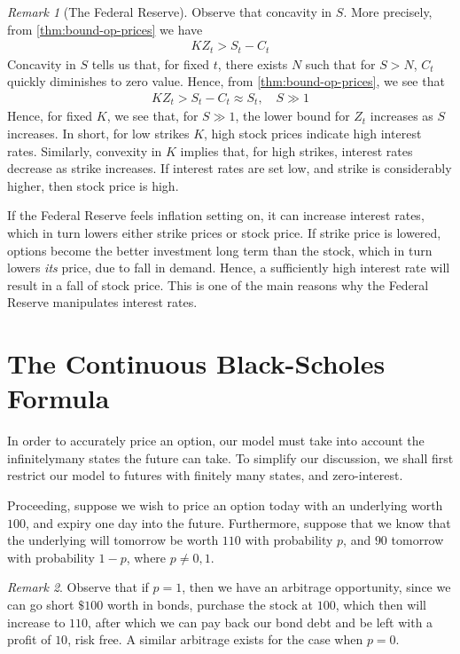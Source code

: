 \documentclass[12pt]{article}
\theoremstyle{plain}
\theoremstyle{definition}
\theoremstyle{remark}
\newtheorem*{remark}{Remark}
\numberwithin{equation}{section}  %
\begin{document}
\begin{remark}[The Federal Reserve]
	Observe that concavity in $S$. More precisely, from
	\cref{thm:bound-op-prices} we have
	\begin{equation*}
		\begin{split}
			KZ_{t} > S_{t} - C_{t}
		\end{split}
	\end{equation*}
	Concavity in $S$ tells us that, for fixed $t$, there exists $N$ such that for
	$S > N$, $C_{t}$ quickly diminishes to zero value. Hence, from
	\cref{thm:bound-op-prices}, we see that
	\begin{equation*}
		\begin{split}
			KZ_{t} > S_{t} - C_{t} \approx S_{t}, \quad S \gg 1
		\end{split}
	\end{equation*}
	Hence, for fixed $K$, we see that, for $S \gg 1$, the lower bound for $Z_{t}$
	increases as $S$ increases.  In short, for low strikes $K$, high stock prices
	indicate high interest rates. Similarly, convexity in $K$ implies that, for
	high strikes, interest rates decrease as strike increases. If interest rates
	are set low, and strike is considerably higher, then stock price is high.

	If the Federal Reserve feels inflation setting on, it can increase interest
	rates,
	which in turn lowers either strike prices or stock price.  If strike price is
	lowered, options become the better investment long term than the stock, which
	in turn lowers \emph{its} price, due to fall in demand. Hence, a sufficiently
	high interest rate will result in a fall of stock price. This is one of the
	main reasons why the Federal Reserve manipulates interest rates.
\end{remark}
	\section{The Continuous Black-Scholes Formula}
In order to accurately price an option, our model must take into account the infinitelymany states the future can take. To simplify our discussion, we shall first restrict our model to futures with finitely many states, and zero-interest. 

Proceeding, suppose we wish to price an option today with an underlying worth $100$,
and expiry one day into the future. Furthermore, suppose that we know
that the underlying will tomorrow be worth $110$ with probability $p$,
and $90$ tomorrow with probability $1-p$, where $p \neq 0,1$. 
\begin{remark}
	Observe that if $p=1$, then we have an arbitrage opportunity, since
	we can go short $\$100$ worth in bonds, purchase the stock at $100$, which then will increase to $110$, after which we can pay back our bond debt and be left with 
	a profit of $10$, risk free. A similar arbitrage exists for the case when $p=0$.
\end{remark}
\end{document}
